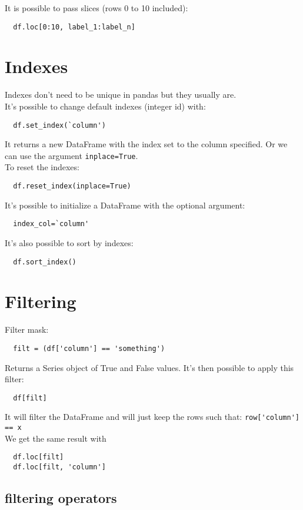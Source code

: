 \documentclass[french]{article}
\begin{document}
It is possible to pass slices (rows 0 to 10 included):
\begin{verbatim}
  df.loc[0:10, label_1:label_n]
\end{verbatim}

\section{Indexes}

Indexes don't need to be unique in pandas but they usually are.\\
It's possible to change default indexes (integer id) with:
\begin{verbatim}
  df.set_index(`column')
\end{verbatim}
It returns a new DataFrame with the index set to the column specified. Or we can use the argument \verb|inplace=True|.\\

To reset the indexes:
\begin{verbatim}
  df.reset_index(inplace=True)
\end{verbatim}
It's possible to initialize a DataFrame with the optional argument:
\begin{verbatim}
  index_col=`column'
\end{verbatim}
It's also possible to sort by indexes:
\begin{verbatim}
  df.sort_index()
\end{verbatim}

\section{Filtering}

Filter mask:
\begin{verbatim}
  filt = (df['column'] == 'something')
\end{verbatim}
Returns a Series object of True and False values. It's then possible to apply this filter:
\begin{verbatim}
  df[filt]
\end{verbatim}
It will filter the DataFrame and will just keep the rows such that: \verb|row['column'] == x|\\
We get the same result with
\begin{verbatim}
  df.loc[filt]
  df.loc[filt, 'column']
\end{verbatim}

\subsection{filtering operators}
\end{document}
